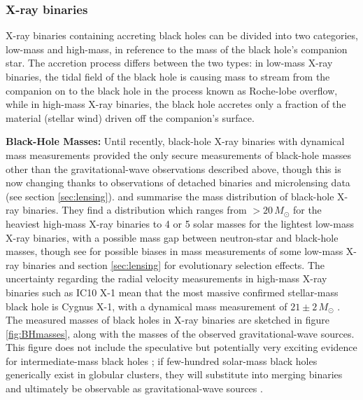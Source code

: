 \documentclass[review]{elsarticle}
\begin{document}
\subsubsection{X-ray binaries}

X-ray binaries containing accreting black holes can be divided into two categories, low-mass and high-mass, in reference to the mass of the black hole's companion star. The accretion process differs between the two types: in low-mass X-ray binaries, the tidal field of the black hole is causing mass to stream from the companion on to the black hole in the process known as Roche-lobe overflow, while in high-mass X-ray binaries, the black hole accretes only a fraction of the material (stellar wind) driven off the companion's surface.

\textbf{Black-Hole Masses:} 
Until recently, black-hole X-ray binaries with dynamical mass measurements provided the only secure measurements of black-hole masses other than the gravitational-wave observations described above, though this is now changing thanks to observations of detached binaries and microlensing data (see section \ref{sec:lensing}).  \citet{Ozel:2010} and \citet{Farr:2011} summarise the mass distribution of black-hole X-ray binaries.  They find a distribution which ranges from $> 20\, M_\odot$ for the heaviest high-mass X-ray binaries to 4 or 5 solar masses for the lightest low-mass X-ray binaries, with a possible mass gap between neutron-star and black-hole masses, though see \cite{Kreidberg:2012} for possible biases in mass measurements of some low-mass X-ray binaries and section \ref{sec:lensing} for evolutionary selection effects.  The uncertainty regarding the radial velocity measurements in high-mass X-ray binaries such as IC10 X-1 \citep{Laycock:2015} mean that the most massive confirmed stellar-mass black hole is Cygnus X-1, with a dynamical mass measurement of $21 \pm 2\, M_\odot$ \citep{MillerJones:2021}.   The measured masses of black holes in X-ray binaries are sketched in figure \ref{fig:BHmasses}, along with the masses of the observed gravitational-wave sources.  This figure does not include the speculative but potentially very exciting evidence for intermediate-mass black holes \citep{MillerColbert:2004,Greene:2019,Paynter:2021}; if few-hundred solar-mass black holes generically exist in globular clusters, they will substitute into merging binaries and ultimately be observable as gravitational-wave sources \citep[e.g.,][]{Mandel:2008,IMBBH:O1}.
\end{document}
